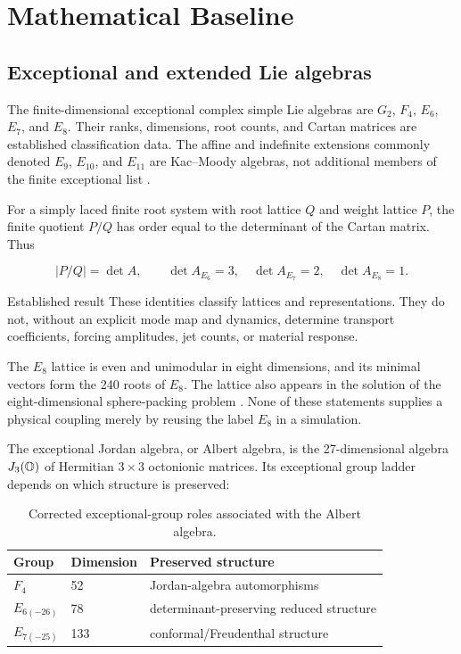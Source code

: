 \chapter{Mathematical Baseline}
\label{ch:mathematics}

\section{Exceptional and extended Lie algebras}

The finite-dimensional exceptional complex simple Lie algebras are
$G_2$, $F_4$, $E_6$, $E_7$, and $E_8$. Their ranks, dimensions, root counts,
and Cartan matrices are established classification data. The affine and
indefinite extensions commonly denoted $E_9$, $E_{10}$, and $E_{11}$ are
Kac--Moody algebras, not additional members of the finite exceptional list
\citep{kac1990infinite}.

For a simply laced finite root system with root lattice $Q$ and weight lattice
$P$, the finite quotient $P/Q$ has order equal to the determinant of the Cartan
matrix. Thus

\begin{equation}
  |P/Q| = \det A,
  \qquad
  \det A_{E_6}=3,
  \quad
  \det A_{E_7}=2,
  \quad
  \det A_{E_8}=1.
\end{equation}

\begin{evidence}{Established result}
These identities classify lattices and representations. They do not, without
an explicit mode map and dynamics, determine transport coefficients, forcing
amplitudes, jet counts, or material response.
\end{evidence}

The $E_8$ lattice is even and unimodular in eight dimensions, and its minimal
vectors form the 240 roots of $E_8$. The lattice also appears in the solution
of the eight-dimensional sphere-packing problem \citep{cohn2017sphere}. None of
these statements supplies a physical coupling merely by reusing the label
$E_8$ in a simulation.

The exceptional Jordan algebra, or Albert algebra, is the 27-dimensional
algebra $J_3(\mathbb{O})$ of Hermitian $3\times3$ octonionic matrices. Its exceptional
group ladder depends on which structure is preserved:

\begin{table}[htbp]
  \centering
  \caption{Corrected exceptional-group roles associated with the Albert algebra.}
  \label{tab:albert-group-ladder}
  \begin{tabular}{lll}
    \toprule
    Group & Dimension & Preserved structure \\
    \midrule
    $F_4$ & 52 & Jordan-algebra automorphisms \\
    $E_{6(-26)}$ & 78 & determinant-preserving reduced structure \\
    $E_{7(-25)}$ & 133 & conformal/Freudenthal structure \\
    \bottomrule
  \end{tabular}
\end{table}

